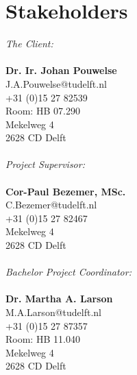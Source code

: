 \section{Stakeholders}
\textit{The Client:}\\
\\
\textbf{Dr. Ir. Johan Pouwelse}\\
J.A.Pouwelse@tudelft.nl\\
+31 (0)15 27 82539\\
Room: HB 07.290\\
Mekelweg 4\\
2628 CD Delft\\
\\
\textit{Project Supervisor:}\\
\\
\textbf{Cor-Paul Bezemer, MSc.}\\
C.Bezemer@tudelft.nl\\ 
+31 (0)15 27 82467\\
Mekelweg 4\\
2628 CD Delft\\
\\
\textit{Bachelor Project Coordinator:}\\
\\
\textbf{Dr. Martha A. Larson}\\
M.A.Larson@tudelft.nl\\
+31 (0)15 27 87357\\
Room: HB 11.040\\
Mekelweg 4\\
2628 CD Delft\\
